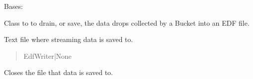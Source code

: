 \documentclass[letterpaper,10pt,english]{sphinxmanual}
\begin{document}
\begin{fulllineitems}
\label{\detokenize{Morelia.Stream.Drain:Morelia.Stream.Drain.ToEDF.DrainToEDF}}
\pysigstartsignatures
{}
\pysigstopsignatures
\sphinxAtStartPar
Bases: {\hyperref[\detokenize{Morelia.Stream.Drain:Morelia.Stream.Drain.ToFile.DrainToFile}]{}}

\sphinxAtStartPar
Class to to drain, or save, the data drops collected by a Bucket into an EDF file.

\begin{fulllineitems}
\label{\detokenize{Morelia.Stream.Drain:Morelia.Stream.Drain.ToEDF.DrainToEDF.file}}
\pysigstartsignatures
{}
\pysigstopsignatures
\sphinxAtStartPar
Text file where streaming data is saved to.
\begin{quote}\begin{description}
\sphinxAtStartPar
EdfWriter|None

\end{description}\end{quote}

\end{fulllineitems}


\begin{fulllineitems}
\label{\detokenize{Morelia.Stream.Drain:Morelia.Stream.Drain.ToEDF.DrainToEDF.CloseFile}}
\pysigstartsignatures
{}
\pysigstopsignatures
\sphinxAtStartPar
Closes the file that data is saved to.


\end{fulllineitems}
\end{fulllineitems}
\end{document}
